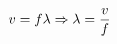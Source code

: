 \documentclass[preview]{standalone}
\begin{document}
\begin{align*}
\special{dvisvgm:raw <g id='unique000'>}v = f\lambda \Rightarrow \lambda = \frac{v}{f}\special{dvisvgm:raw </g>}
\end{align*}
\end{document}
